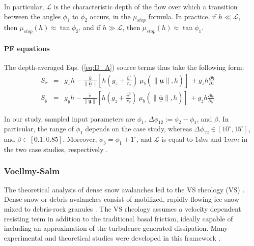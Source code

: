 \documentclass{article}
\begin{document}
In particular, $\mathcal{L}$ is the characteristic depth of the flow over which a transition between the angles $\phi_{1}$ to $\phi_{2}$ occurs, in the $\mu_{stop}$ formula. In practice, if $h\ll \mathcal L$, then $\mu_{stop}(h)\approx \tan\phi_{2}$, and if $h\gg \mathcal L$, then $\mu_{stop}(h)\approx\tan\phi_{1}$.

\paragraph{PF equations} The depth-averaged Eqs. (\ref{eq:D_A}) source terms thus take the following form:
\begin{eqnarray}\label{eq:S_terms_PF}
S_{x} &=&  g_{x} h -  \frac{\bar{u}}{\| \underset{^\sim}{\bar{\textbf{u}}} \|}\left[h \left(g_z+\frac{\bar{u}^2}{r_x}\right) \ \mu_{b}(\|\underset{^\sim}{\bar{\textbf{u}}} \| , h)\right] \ + g_{z}h\frac{\partial h}{\partial x} \nonumber \\
S_{y} &=&  g_{y} h - \frac{\bar{v}}{\| \underset{^\sim}{\bar{\textbf{u}}} \|}\left[h \left(g_z +\frac{\bar{v}^2}{r_y}\right) \ \mu_{b}(\|\underset{^\sim}{\bar{\textbf{u}}} \| , h)\right] \ + g_{z}h\frac{\partial h}{\partial y}
\end{eqnarray}

In our study, sampled input parameters are $\phi_1$, $\Delta \phi_{12}:=\phi_2-\phi_1$, and $\beta$. In particular, the range of $\phi_1$ depends on the case study, whereas $\Delta \phi_{12} \in [10^{\mathrm{\circ}}, 15^{\mathrm{\circ}}]$, and $\beta \in [0.1, 0.85]$. Moreover, $\phi_3=\phi_1+1^\mathrm{\circ}$, and $\mathcal{L}$ is equal to $1 dm$ and $1 mm$ in the two case studies, respectively \citep{PouliquenForterre2002,ForterrePouliquen2003}.

\subsubsection{Voellmy-Salm}\label{VSM}
The theoretical analysis of dense snow avalanches led to the VS rheology (VS) \citep{Voellmy1955, Salm1990, Salm1993, Bartelt1999}. Dense snow or debris avalanches consist of mobilized, rapidly flowing ice-snow mixed to debris-rock granules \citep{BarteltMcArdell2009}. The VS rheology assumes a velocity dependent resisting term in addition to the traditional basal friction, ideally capable of including an approximation of the turbulence-generated dissipation. Many experimental and theoretical studies were developed in this framework \citep{Gruber2007, Kern2009, Christen2010, Fischer2012}.
\end{document}
